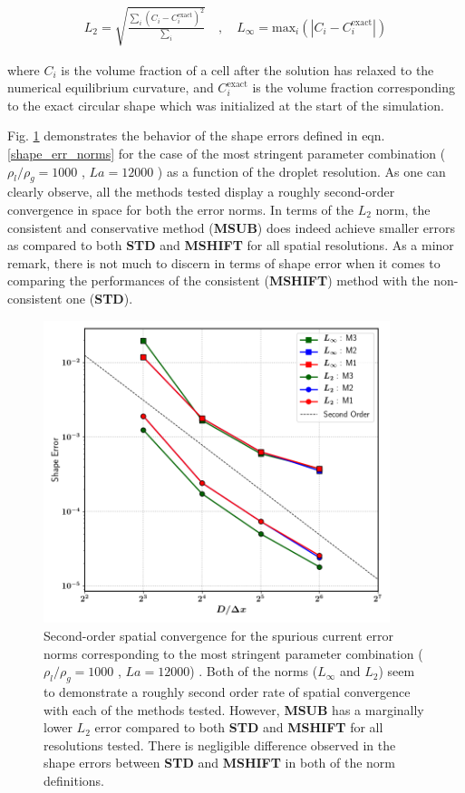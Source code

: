 \begin{align}
	L_2 = \sqrt{\frac{\sum_i \left(C_i - C_i^\text{exact} \right)^2}{\sum_i}} \quad , \quad L_\infty = \text{max}_i \left( | C_i - C_i^\text{exact} | \right)
  \label{shape_err_norms}
\end{align}

where $C_i$ is the volume fraction of a cell after the solution has relaxed to the numerical equilibrium curvature, and $C_i^\text{exact}$ is the volume fraction corresponding to the exact circular shape which was initialized at the start of the simulation.  

Fig. \ref{static_drop_conv} demonstrates the behavior of the shape errors defined in eqn. \ref{shape_err_norms} for the case of the most stringent parameter combination ( $\rho_l / \rho_g = 1000 $ , $La = 12000$ ) as a function of the droplet resolution. As one can clearly observe, all the methods tested display a roughly second-order convergence in space for both the error norms. In terms of the $L_2$ norm, the consistent and conservative method (\textbf{MSUB}) does indeed achieve smaller errors as compared to both \textbf{STD} and \textbf{MSHIFT} for all spatial resolutions. As a minor remark, there is not much to discern in terms of shape error when it comes to comparing the performances of the consistent (\textbf{MSHIFT}) method with the non-consistent one (\textbf{STD}). 

\begin{figure}[h!]
    \centering
    \includegraphics[width = 0.9\textwidth]{plots/static_drop/static_drop_convergence.png}
	\caption{Second-order spatial convergence for the spurious current error norms corresponding to the most stringent parameter combination ($\rho_l/\rho_g = 1000$ , $La = 12000$) . Both of the norms ($L_\infty$ and $L_2$) seem to demonstrate a roughly second order rate of spatial convergence with each of the methods tested. However, \textbf{MSUB} has a marginally lower $L_2$ error compared to both \textbf{STD} and \textbf{MSHIFT} for all resolutions tested. There is negligible difference observed in the shape errors between \textbf{STD} and \textbf{MSHIFT} in both of the norm definitions.}   
    \label{static_drop_conv}
\end{figure}



